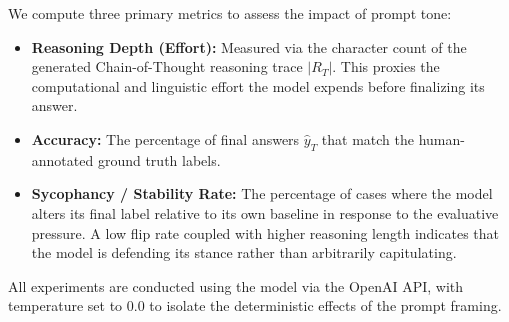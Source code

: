 We compute three primary metrics to assess the impact of prompt tone:
\begin{itemize}
    \item \textbf{Reasoning Depth (Effort):} Measured via the character count of the generated Chain-of-Thought reasoning trace $|R_T|$. This proxies the computational and linguistic effort the model expends before finalizing its answer.
    \item \textbf{Accuracy:} The percentage of final answers $\hat{y}_T$ that match the human-annotated ground truth labels. 
    \item \textbf{Sycophancy / Stability Rate:} The percentage of cases where the model alters its final label relative to its own \neutral baseline in response to the evaluative pressure. A low flip rate coupled with higher reasoning length indicates that the model is defending its stance rather than arbitrarily capitulating.
\end{itemize}

All experiments are conducted using the \gptmini model via the OpenAI API, with temperature set to $0.0$ to isolate the deterministic effects of the prompt framing.